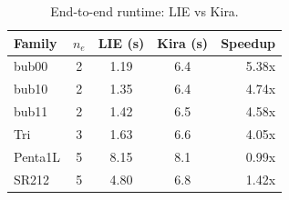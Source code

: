 \begin{table}[h]
\centering
\begin{tabular}{lcccr}
\toprule
Family & $n_e$ & LIE (s) & Kira (s) & Speedup \\
\midrule
bub00 & 2 & 1.19 & 6.4 & 5.38x \\
bub10 & 2 & 1.35 & 6.4 & 4.74x \\
bub11 & 2 & 1.42 & 6.5 & 4.58x \\
Tri & 3 & 1.63 & 6.6 & 4.05x \\
Penta1L & 5 & 8.15 & 8.1 & 0.99x \\
SR212 & 5 & 4.80 & 6.8 & 1.42x \\
\bottomrule
\end{tabular}
\caption{End-to-end runtime: LIE vs Kira.}
\end{table}